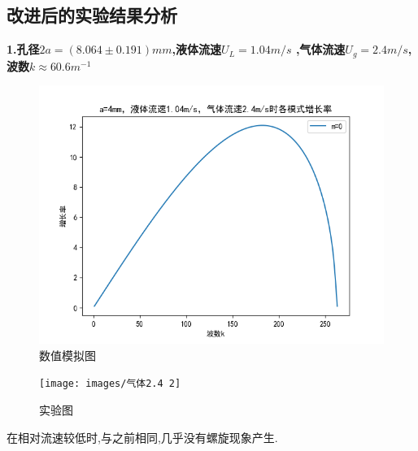 \documentclass[UTF8]{gapd}
\begin{document}
\subsection{改进后的实验结果分析}

\textbf{1.孔径$2a=(8.064 \pm 0.191)mm$,液体流速$U_{L}=1.04m/s$ ,气体流速$U_{g}=2.4m/s$,波数$k \approx60.6m^{-1}$}
\begin{figure}[H]
	\centering
	\includegraphics[width=0.8\linewidth]{images/Figure_3(2)}
	\caption{数值模拟图}
	\label{fig:P20}
\end{figure}
\begin{figure}[H]
	\centering
	\texttt{[image: images/气体2.4 2]}
	\caption{实验图}
	\label{fig:P21}
\end{figure}

在相对流速较低时,与之前相同,几乎没有螺旋现象产生.
\end{document}

